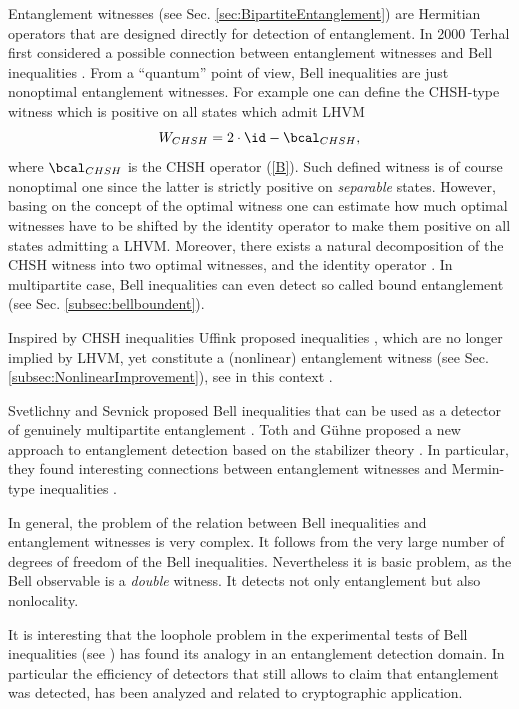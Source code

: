 \documentclass[rmp,12pt,preprint]{revtex4-2}
\begin{document}
Entanglement witnesses (see Sec. \ref{sec:BipartiteEntanglement}) are
Hermitian operators that are designed directly for detection of
entanglement. In 2000 Terhal first considered a possible connection
between entanglement witnesses and Bell inequalities \cite
{TerhalB}. From a ``quantum'' point of view, Bell inequalities are
just nonoptimal entanglement witnesses. For example one can define the
CHSH-type witness which is positive on all states which admit
LHVM
\begin{equation}
  W_{CHSH}=2\cdot\id-\bcal_{CHSH}, \label{ter}
\end{equation}
where $\bcal_{CHSH}$ is the CHSH operator (\ref {B}). Such defined
witness is of course nonoptimal one since the latter is strictly
positive on {\it separable} states. However, basing on the concept of
the optimal witness \cite {Lewenstein00a} one can estimate how much
optimal witnesses have to be shifted by the identity operator to make
them positive on all states admitting a LHVM. Moreover, there exists a
natural decomposition of the CHSH witness into two optimal witnesses,
and the identity operator \cite {Hyllus}. In multipartite case, Bell
inequalities can even detect so called bound entanglement
\cite{Dur,Kaszlikowski, Sen, Augusiak} (see
Sec. \ref{subsec:bellboundent}).

Inspired by CHSH inequalities Uffink proposed inequalities
\cite{Uffink2002}, which are no longer implied by LHVM, yet constitute
a (nonlinear) entanglement witness (see
Sec. \ref{subsec:NonlinearImprovement}), see in this context \cite{UffinkS-strong-Bell-2006}.

Svetlichny and Sevnick
proposed Bell inequalities that can be used as a detector of genuinely
multipartite entanglement \cite{Svetlichny}.  Toth and G{\"u}hne
proposed a new approach to entanglement detection  \cite
{TothG_s,TothG_ent_det}based on the stabilizer theory \cite {Gottesman}. In particular,
they found interesting connections between entanglement
witnesses and Mermin-type inequalities \cite{TothG_ent_det}.

In general, the problem of the relation between Bell inequalities and
entanglement witnesses is very complex. It follows from the very large
number of degrees of freedom of the Bell inequalities.  Nevertheless
it is basic problem, as the Bell observable is a {\it double}
witness. It detects not only entanglement but also nonlocality.

It is interesting that the loophole problem in the experimental tests
of Bell inequalities (see \cite{Gill}) has found its analogy
\cite{SkwaraKKB2006} in an entanglement detection domain. In
particular the efficiency of detectors that still allows to claim that
entanglement was detected, has been analyzed and related to
cryptographic application.
\end{document}
